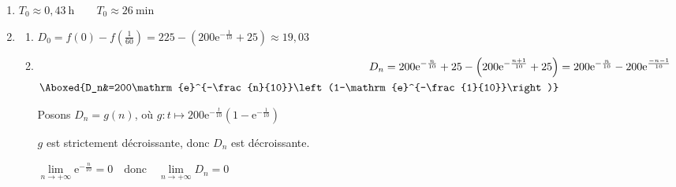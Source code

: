 \documentclass{scrartcl}
\newcommand{\me}{\mathrm{e}}
\begin{document}
\begin{adjustwidth}{2em}{0pt}
\begin{enumerate}
            \item   $T_0\approx 0{,}43\ \text{h}\qquad\boxed{T_0\approx 26\ \text{min}}$
            \item   \begin{enumerate}[label=\alph*)]
                        \item	$D_0=f(0)-f\left(\frac{1}{60}\right)=225-\left(200\me^{-\frac{1}{10}}+25\right)\approx 19{,}03$ \par
                        \item   $\begin{aligned}[t]
                                    D_n=200\me^{-\frac{n}{10}}+25-\left(200\me^{-\frac{n+1}{10}}+25\right)&=200\me^{-\frac{n}{10}}-200\me^{\frac{-n-1}{10}} \\
                                    \Aboxed{D_n&=200\me^{-\frac{n}{10}}\left(1-\me^{-\frac{1}{10}}\right)}
                                \end{aligned}$ \par \vspace{1em}
                                Posons $D_n=g(n)$, où $g:t\mapsto 200\me^{-\frac{t}{10}}\left(1-\me^{-\frac{1}{10}}\right)$ \par
                                $g$ est strictement décroissante, donc $D_n$ est décroissante. \par
                                $\lim\limits_{n\to +\infty}\me^{-\frac{n}{10}}=0\quad\text{donc}\quad\lim\limits_{n\to +\infty}D_n=0$ \par
                    \end{enumerate}
        \end{enumerate}
    \end{adjustwidth}
\end{document}

